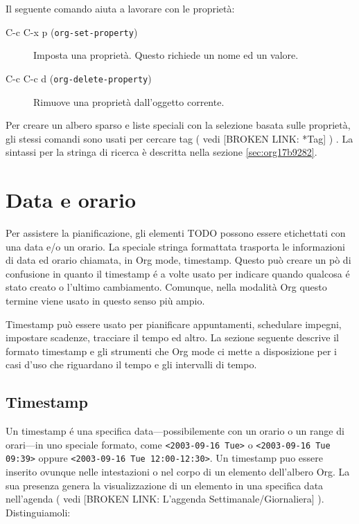 \documentclass[11pt]{article}
\begin{document}
Il seguente comando aiuta a lavorare con le proprietà:

\begin{description}
\item[{C-c C-x p (\texttt{org-set-property})}] Imposta una proprietà. Questo richiede un nome ed un valore.

\item[{C-c C-c d (\texttt{org-delete-property})}] Rimuove una proprietà dall'oggetto corrente.
\end{description}

Per creare un albero sparso e liste speciali con la selezione basata
sulle proprietà, gli stessi comandi sono usati per cercare tag ( vedi
[BROKEN LINK: *Tag] ) . La sintassi per la stringa di ricerca è descritta nella
sezione \ref{sec:org17b9282}.

\section{Data e orario}
\label{sec:org733fa6d}
Per assistere la pianificazione, gli elementi TODO possono essere
etichettati con una data e/o un orario. La speciale stringa formattata
trasporta le informazioni di data ed orario chiamata, in Org mode,
timestamp. Questo può creare un pò di confusione in quanto il
timestamp é a volte usato per indicare quando qualcosa é stato creato
o l'ultimo cambiamento. Comunque, nella modalità Org questo termine
viene usato in questo senso più ampio.

Timestamp può essere usato per pianificare appuntamenti, schedulare
impegni, impostare scadenze, tracciare il tempo ed altro. La sezione
seguente descrive il formato timestamp e gli strumenti che Org mode ci
mette a disposizione per i casi d'uso che riguardano il tempo e gli
intervalli di tempo.

\subsection{Timestamp}
\label{sec:orgffbfc92}
Un timestamp é una specifica data---possibilemente con un orario o un
range di orari---in uno speciale formato, come \texttt{<2003-09-16 Tue>} o
\texttt{<2003-09-16 Tue 09:39>} oppure \texttt{<2003-09-16 Tue 12:00-12:30>}.
Un timestamp puo essere inserito ovunque nelle intestazioni o nel corpo di un
elemento dell'albero Org. La sua presenza genera la visualizzazione di
un elemento in una specifica data nell'agenda ( vedi [BROKEN LINK: L'aggenda Settimanale/Giornaliera] ). Distinguiamoli:
\end{document}

